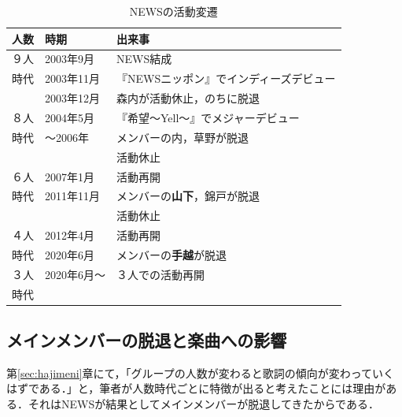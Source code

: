 \begin{table}[tb]
	\centering
	\scriptsize
	\caption{NEWSの活動変遷}
	\label{tab:news-history}
	\begin{tabular}{c|l|l}
		\hline
		人数 & 時期       & 出来事                    \\
		\hline\hline
		９人 & 2003年9月  & NEWS結成                 \\
		時代 & 2003年11月 & 『NEWSニッポン』でインディーズデビュー  \\
		   & 2003年12月 & 森内が活動休止，のちに脱退          \\
		\hline
		８人 & 2004年5月  & 『希望～Yell～』でメジャーデビュー    \\
		時代 & ～2006年   & メンバーの内，草野が脱退           \\
		   &          & 活動休止                   \\
		\hline
		６人 & 2007年1月  & 活動再開                   \\
		時代 & 2011年11月 & メンバーの\textbf{山下}，錦戸が脱退 \\
		   &          & 活動休止                   \\
		\hline
		４人 & 2012年4月  & 活動再開                   \\
		時代 & 2020年6月  & メンバーの\textbf{手越}が脱退    \\
		\hline
		３人 & 2020年6月～ & ３人での活動再開               \\
		時代 &          &                        \\
		\hline

	\end{tabular}
\end{table}


\subsection{メインメンバーの脱退と楽曲への影響}

第\ref{sec:hajimeni}章にて，「グループの人数が変わると歌詞の傾向が変わっていくはずである．」と，筆者が人数時代ごとに特徴が出ると考えたことには理由がある．それはNEWSが結果としてメインメンバーが脱退してきたからである．

